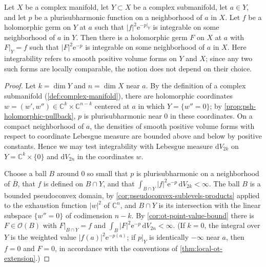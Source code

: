 \begin{corollary}\label{cor:integrable-germ-restriction}
Let $X$ be a complex manifold, let $Y\subset X$ be a complex submanifold, let $a\in Y$, and let $p$ be a plurisubharmonic function on a neighborhood of $a$ in $X$. Let $f$ be a holomorphic germ on $Y$ at $a$ such that $|f|^2\mathrm e^{-p|_Y}$ is integrable on some neighborhood of $a$ in $Y$. Then there is a holomorphic germ $F$ on $X$ at $a$ with $F|_Y=f$ such that $|F|^2\mathrm e^{-p}$ is integrable on some neighborhood of $a$ in $X$. Here integrability refers to smooth positive volume forms on $Y$ and $X$; since any two such forms are locally comparable, the notion does not depend on their choice.
\end{corollary}
\begin{proof}
Let $k=\dim Y$ and $n=\dim X$ near $a$. By the definition of a complex submanifold (\cref{def:complex-manifold}), there are holomorphic coordinates $w=(w',w'')\in\mathbb C^k\times\mathbb C^{n-k}$ centered at $a$ in which $Y=\{w''=0\}$; by \cref{prop:psh-holomorphic-pullback}, $p$ is plurisubharmonic near $0$ in these coordinates. On a compact neighborhood of $a$, the densities of smooth positive volume forms with respect to coordinate Lebesgue measure are bounded above and below by positive constants. Hence we may test integrability with Lebesgue measure $\mathrm dV_{2k}$ on $Y=\mathbb C^k\times\{0\}$ and $\mathrm dV_{2n}$ in the coordinates $w$.

Choose a ball $B$ around $0$ so small that $p$ is plurisubharmonic on a neighborhood of $\overline B$, that $f$ is defined on $B\cap Y$, and that $\int_{B\cap Y}|f|^2\mathrm e^{-p}\,\mathrm dV_{2k}<\infty$. The ball $B$ is a bounded pseudoconvex domain, by \cref{cor:pseudoconvex-sublevels-products} applied to the exhaustion function $|w|^2$ of $\mathbb C^n$, and $B\cap Y$ is its intersection with the linear subspace $\{w''=0\}$ of codimension $n-k$. By \cref{cor:ot-point-value-bound} there is $F\in\mathcal O(B)$ with $F|_{B\cap Y}=f$ and $\int_B|F|^2\mathrm e^{-p}\,\mathrm dV_{2n}<\infty$. (If $k=0$, the integral over $Y$ is the weighted value $|f(a)|^2\mathrm e^{-p(a)}$; if $p|_Y$ is identically $-\infty$ near $a$, then $f=0$ and $F=0$, in accordance with the conventions of \cref{thm:local-ot-extension}.)
\end{proof}
